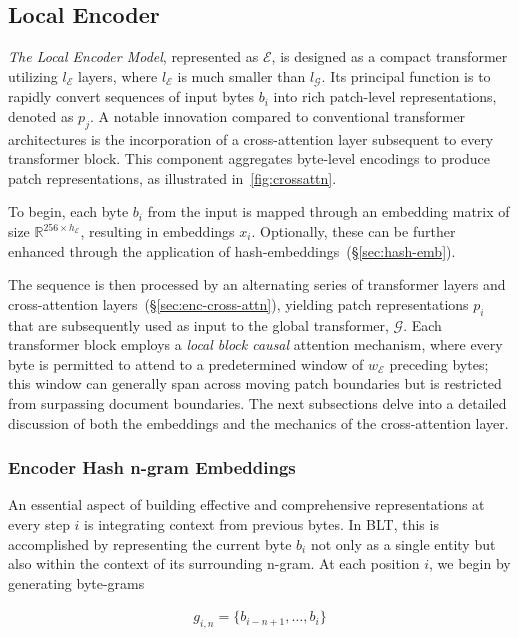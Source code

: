 \subsection{Local Encoder}
\label{section:local}

\textit{The Local Encoder Model}, represented as $\mathcal{E}$, is designed as a compact transformer utilizing $l_{\mathcal{E}}$ layers, where $l_{\mathcal{E}}$ is much smaller than $l_{\mathcal{G}}$. Its principal function is to rapidly convert sequences of input bytes $b_i$ into rich patch-level representations, denoted as $p_j$. A notable innovation compared to conventional transformer architectures is the incorporation of a cross-attention layer subsequent to every transformer block. This component aggregates byte-level encodings to produce patch representations, as illustrated in~\autoref{fig:crossattn}.

To begin, each byte $b_i$ from the input is mapped through an embedding matrix of size $\mathbb{R}^{256 \times h_{\mathcal{E}}}$, resulting in embeddings $x_i$. Optionally, these can be further enhanced through the application of hash-embeddings~(\S\ref{sec:hash-emb}). 

The sequence is then processed by an alternating series of transformer layers and cross-attention layers~(\S\ref{sec:enc-cross-attn}), yielding patch representations $p_i$ that are subsequently used as input to the global transformer, $\mathcal{G}$. Each transformer block employs a \textit{local block causal} attention mechanism, where every byte is permitted to attend to a predetermined window of $w_{\mathcal{E}}$ preceding bytes; this window can generally span across moving patch boundaries but is restricted from surpassing document boundaries. The next subsections delve into a detailed discussion of both the embeddings and the mechanics of the cross-attention layer.

\subsubsection{Encoder Hash n-gram Embeddings}
\label{sec:ngram-emb}
\label{sec:hash-emb}
An essential aspect of building effective and comprehensive representations at every step $i$ is integrating context from previous bytes. In {\textsc BLT}, this is accomplished by representing the current byte $b_i$ not only as a single entity but also within the context of its surrounding n-gram. At each position $i$, we begin by generating byte-grams

\begin{align}
    g_{i,n}=\{b_{i-n + 1},\ldots, b_i\}
\end{align}

